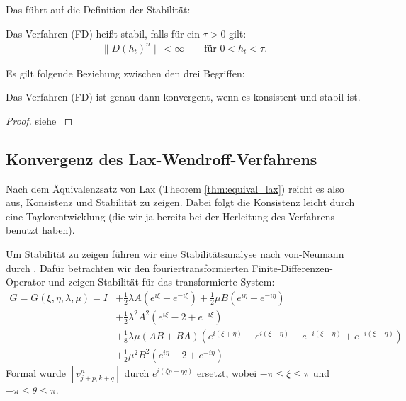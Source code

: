 Das führt auf die Definition der Stabilität:

\begin{definition}
    Das Verfahren (FD) heißt stabil, falls für ein $\tau > 0 $ gilt:
    \begin{align}
        \| D(h_t)^n \| < \infty \qquad \text{für $0 < h_t < \tau$.}
    \end{align}
\end{definition}

Es gilt folgende Beziehung zwischen den drei Begriffen:

\begin{thm} \label{thm:equival_lax}
    Das Verfahren (FD) ist genau dann konvergent, wenn es konsistent und stabil ist.
\end{thm}
\begin{proof}
    siehe \parencite[][Kapitel 3.5]{richtmyer1994difference}
\end{proof}

\subsection{Konvergenz des Lax-Wendroff-Verfahrens}
Nach dem Äquivalenzsatz von Lax (Theorem \ref{thm:equival_lax}) reicht es also aus, Konsistenz und Stabilität zu zeigen. Dabei folgt die Konsistenz leicht durch eine Taylorentwicklung (die wir ja bereits bei der Herleitung des Verfahrens benutzt haben). 

Um Stabilität zu zeigen führen wir eine Stabilitätsanalyse nach von-Neumann durch \parencite[][Kapitel 4.4]{richtmyer1994difference}. Dafür betrachten wir den fouriertransformierten Finite-Diffe\-renzen-Operator und zeigen Stabilität für das transformierte System:
\begin{align}
    G = G(\xi, \eta, \lambda, \mu) = I
    & + \frac{1}{2} \lambda A (e^{i\xi} - e^{-i\xi})+ \frac{1}{2} \mu B (e^{i\eta} - e^{-i\eta}) \nonumber \\
    & + \frac{1}{2} \lambda^2 A^2 (e^{i\xi} - 2 + e^{-i\xi}) \nonumber \\
    & + \frac{1}{8} \lambda \mu  (AB+BA) (e^{i(\xi+\eta)} - e^{i(\xi-\eta)} - e^{-i(\xi-\eta)} + e^{-i(\xi+\eta)}) \nonumber \\
    & + \frac{1}{2} \mu^2 B^2 (e^{i\eta} - 2 + e^{-i\eta})
\end{align}
Formal wurde $[v^n_{j+p,k+q}]$ durch $e^{i(\xi p + \eta q)}$ ersetzt, wobei $-\pi \le \xi \le \pi$ und $-\pi \le \theta  \le \pi$. \newline

